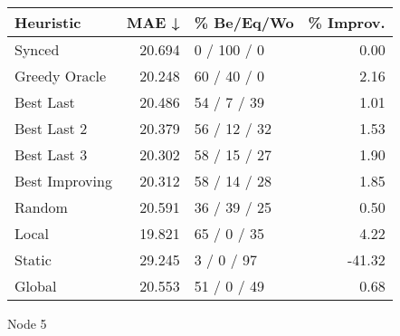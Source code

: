 \begin{tabular}{lrlr}
\toprule
\textbf{Heuristic} & \textbf{MAE ↓} & \textbf{\% Be/Eq/Wo} & \textbf{\% Improv.} \\
\midrule
            Synced &         20.694 &          0 / 100 / 0 &                0.00 \\
     Greedy Oracle &         20.248 &          60 / 40 / 0 &                2.16 \\
         Best Last &         20.486 &          54 / 7 / 39 &                1.01 \\
       Best Last 2 &         20.379 &         56 / 12 / 32 &                1.53 \\
       Best Last 3 &         20.302 &         58 / 15 / 27 &                1.90 \\
    Best Improving &         20.312 &         58 / 14 / 28 &                1.85 \\
            Random &         20.591 &         36 / 39 / 25 &                0.50 \\
             Local &         19.821 &          65 / 0 / 35 &                4.22 \\
            Static &         29.245 &           3 / 0 / 97 &              -41.32 \\
            Global &         20.553 &          51 / 0 / 49 &                0.68 \\
\bottomrule
\end{tabular}
\caption{Node 5}
\label{tab:non_lr01_le1_bs2_5}
